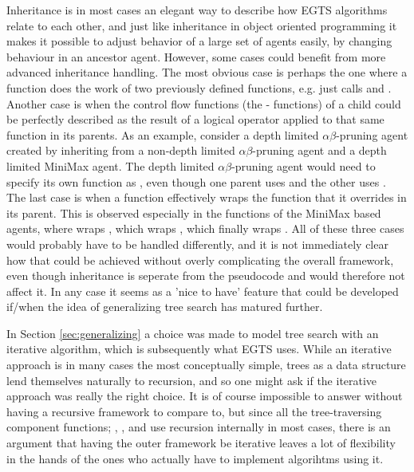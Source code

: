 Inheritance is in most cases an elegant way to describe how EGTS algorithms relate to each other, and just like inheritance in object oriented programming it makes it possible to adjust behavior of a large set of agents easily, by changing behaviour in an ancestor agent. However, some cases could benefit from more advanced inheritance handling. The most obvious case is perhaps the one where a function does the work of two previously defined functions, e.g.  just calls  and . Another case is when the control flow functions (the - functions) of a child could be perfectly described as the result of a logical operator applied to that same function in its parents. As an example, consider a depth limited $\alpha\beta$-pruning agent created by inheriting from a non-depth limited $\alpha\beta$-pruning agent and a depth limited MiniMax agent. The depth limited $\alpha\beta$-pruning agent would need to specify its own \shbp function as , even though one parent uses  and the other uses . The last case is when a function effectively wraps the function that it overrides in its parent. This is observed especially in the \expand functions of the MiniMax based agents, where  wraps , which wraps , which finally wraps . All of these three cases would probably have to be handled differently, and it is not immediately clear how that could be achieved without overly complicating the overall framework, even though inheritance is seperate from the pseudocode and would therefore not affect it. In any case it seems as a 'nice to have' feature that could be developed if/when the idea of generalizing tree search has matured further.


In Section \ref{sec:generalizing} a choice was made to model tree search with an iterative algorithm, which is subsequently what EGTS uses. While an iterative approach is in many cases the most conceptually simple, trees as a data structure lend themselves naturally to recursion, and so one might ask if the iterative approach was really the right choice. It is of course impossible to answer without having a recursive framework to compare to, but since all the tree-traversing component functions; \select, \bp, and \trim use recursion internally in most cases, there is an argument that having the outer framework be iterative leaves a lot of flexibility in the hands of the ones who actually have to implement algorihtms using it. 

